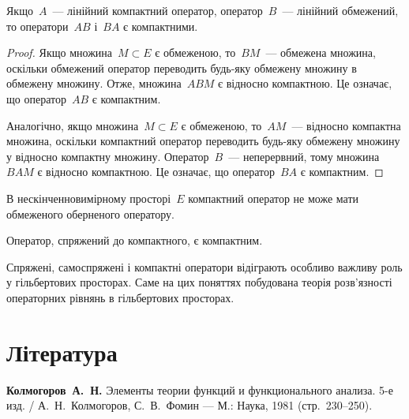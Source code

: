 \begin{theorem}
Якщо~$A$~--- лінійний компактний
оператор, оператор~$B$~--- лінійний обмежений, то
оператори~$AB$ і~$BA$ є компактними.
\end{theorem}

\begin{proof}
Якщо множина~$M \subset E$ є обмеженою,
то~$BM$~--- обмежена множина,
оскільки обмежений оператор
переводить будь-яку обмежену множину
в обмежену множину.
Отже, множина~$ABM$ є відносно компактною.
Це означає, що оператор~$AB$ є компактним.

Аналогічно, якщо множина~$M \subset E$ є обмеженою,
то~$AM$~--- відносно компактна множина,
оскільки компактний оператор
переводить будь-яку обмежену множину
у відносно компактну множину.
Оператор~$B$~--- неперервний,
тому множина~$BAM$ є відносно компактною.
Це означає, що оператор~$BA$ є компактним. 
\end{proof}

\begin{corollary}
В нескінченновимірному просторі~$E$
компактний оператор не може мати
обмеженого оберненого оператору.
\end{corollary}

\begin{theorem}
Оператор, спряжений до компактного, є компактним.
\end{theorem}

Спряжені, самоспряжені і компактні оператори
відіграють особливо важливу роль у гільбертових просторах.
Саме на цих поняттях побудована теорія
розв’язності операторних рівнянь в гільбертових просторах.

\section{Література}

\begin{enumerate}[label={[\arabic*]}]
\item \textbf{Колмогоров~А.~Н.}
Элементы теории функций и функционального анализа. 5-е изд. /
А.~Н.~Колмогоров, С.~В.~Фомин ---
М.: Наука, 1981 (стр.~230--250).
\end{enumerate}
